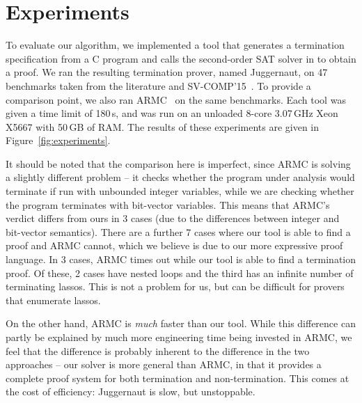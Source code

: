 \documentclass[a4paper]{llncs}
\begin{document}
\section{Experiments}

To evaluate our algorithm, we implemented a tool that generates a
termination specification from a C program and calls the second-order SAT solver in \cite{kalashnikov} to obtain a proof.
We ran the resulting termination prover,
named {\sc Juggernaut}, on 47
benchmarks taken from the literature and
SV-COMP'15~\cite{svcomp15}.
To provide a comparison point, we also ran {\sc ARMC}~\cite{armc-website} on
the same benchmarks.  Each tool was given a time limit of 180\,s, and was
run on an unloaded 8-core 3.07\,GHz Xeon X5667 with 50\,GB of RAM.  The
results of these experiments are given in Figure~\ref{fig:experiments}.

It should be noted that the comparison here is imperfect, since {\sc ARMC}
is solving a slightly different problem -- it checks whether the program
under analysis would terminate if run with unbounded integer variables,
while we are checking whether the program terminates with bit-vector
variables.  This means that {\sc ARMC}'s verdict differs from ours
in 3 cases (due to the differences between integer and bit-vector
semantics).  There are a further 7 cases where our tool is able to find a
proof and {\sc ARMC} cannot, which we believe is due to our more expressive
proof language.  In 3 cases, {\sc ARMC} times out while our tool is able to
find a termination proof.  Of these, 2 cases have nested loops and the
third has an infinite number of terminating lassos.  This is not a problem for us,
but can be difficult for provers that enumerate lassos.

On the other hand, {\sc ARMC} is \emph{much} faster than our tool.  While
this difference can partly be explained by much more engineering time being
invested in {\sc ARMC}, we feel that the difference is probably inherent to
the difference in the two approaches -- our solver is more general
than {\sc ARMC}, in that it provides a complete proof system for both
termination and non-termination.  This comes at the cost of efficiency:
{\sc Juggernaut} is slow, but unstoppable.

\end{document}
